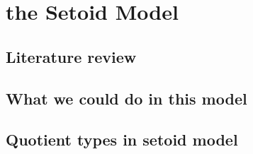 \chapter{the Setoid Model}




\section{Literature review}



\section{What we could do in this model}


\section{Quotient types in setoid model}

